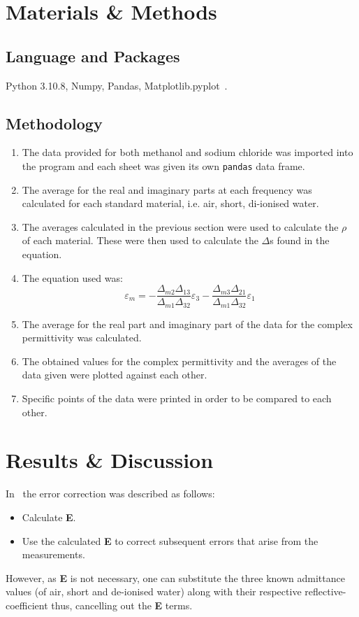\documentclass[12pt, a4paper]{article}
\begin{document}
\section{Materials \& Methods}
\subsection{Language and Packages}
Python 3.10.8, Numpy, Pandas, Matplotlib.pyplot \,.
\subsection{Methodology}
\begin{enumerate}
    \item The data provided for both methanol and sodium chloride was imported into the program and each sheet was given its own \texttt{pandas} data frame.
    \item The average for the real and imaginary parts at each frequency was calculated for each standard material, i.e. air, short, di-ionised water.
    \item The averages calculated in the previous section were used to calculate the \(\rho\) of each material. These were then used to calculate the \(\Delta\)s found in the equation.
    \item The equation used was:
            \begin{equation}
                \varepsilon_m = -\frac{\Delta_{m2}\Delta_{13}}{\Delta_{m1}\Delta_{32}}\varepsilon_3 - \frac{\Delta_{m3}\Delta_{21}}{\Delta_{m1}\Delta_{32}}\varepsilon_1
            \end{equation}
    \item The average for the real part and imaginary part of the data for the complex permittivity was calculated.
    \item The obtained values for the complex permittivity and the averages of the data given were plotted against each other.
    \item Specific points of the data were printed in order to be compared to each other.
\end{enumerate}

\section{Results \& Discussion}
In~\cite{marsland1987dielectric} the error correction was described as follows:
\begin{itemize}
    \item Calculate \textbf{E}.
    \item Use the calculated \textbf{E} to correct subsequent errors that arise from the measurements.
\end{itemize}
However, as \textbf{E} is not necessary, one can substitute the three known admittance values (of air, short and de-ionised water) along with their respective reflective-coefficient thus, cancelling out the \textbf{E} terms.
\end{document}

